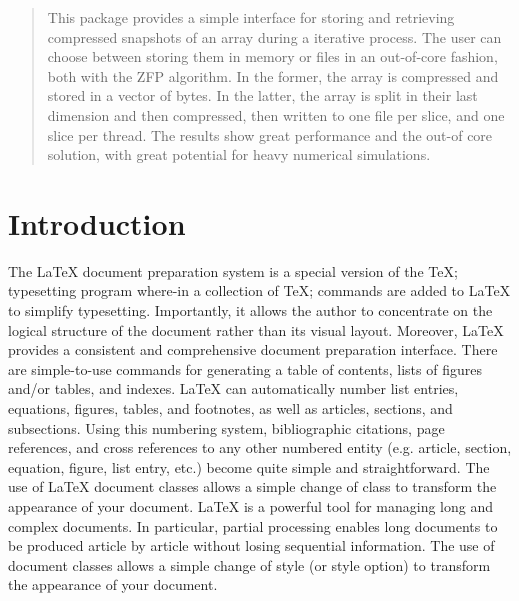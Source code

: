 \documentclass{juliacon}
\begin{document}


\maketitle

\begin{abstract}

This package provides a simple interface for storing and retrieving compressed snapshots of an array during a iterative process.
The user can choose between storing them in memory or files in an out-of-core fashion, both with the ZFP algorithm.
In the former, the array is compressed and stored in a vector of bytes.
In the latter, the array is split in their last dimension and then compressed, then written to one file per slice, and one slice per thread.
The results show great performance and the out-of core solution, with great potential for heavy numerical simulations.

\end{abstract}

\section{Introduction}

The \LaTeX{} document preparation system is a special version of the
\TeX; typesetting program where-in a collection of \TeX; commands
are added to \LaTeX{} to simplify typesetting. Importantly, it allows
the author to concentrate on the logical structure of the document
rather than its visual layout.\vskip 6pt
Moreover, \LaTeX{} provides a consistent and comprehensive document
preparation interface. There are simple-to-use commands for
generating a table of contents, lists of figures and/or tables, and indexes.
\LaTeX{} can automatically number list entries, equations, figures,
tables, and footnotes, as well as articles, sections, and subsections.
Using this numbering system, bibliographic citations, page
references, and cross references to any other numbered entity (e.g.
article, section, equation, figure, list entry, etc.) become quite simple
and straightforward. The use of \LaTeX{} document classes allows
a simple change of class to transform the appearance of your document.\vskip 6pt
\LaTeX{} is a powerful tool for managing long and complex documents.
In particular, partial processing enables long documents to
be produced article by article without losing sequential information.
The use of document classes allows a simple change of style
(or style option) to transform the appearance of your document.
\end{document}
